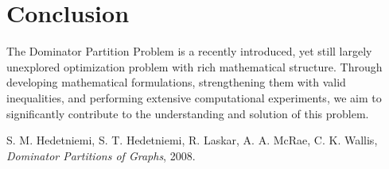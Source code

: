 \documentclass[12pt]{article}
\begin{document}
\section{Conclusion}
The Dominator Partition Problem is a recently introduced, yet still largely unexplored optimization problem with rich mathematical structure. Through developing mathematical formulations, strengthening them with valid inequalities, and performing extensive computational experiments, we aim to significantly contribute to the understanding and solution of this problem.


\clearpage

\begin{thebibliography}{9}

S. M. Hedetniemi, S. T. Hedetniemi, R. Laskar, A. A. McRae, C. K. Wallis,
\textit{Dominator Partitions of Graphs}, 2008.

\end{thebibliography}
\end{document}
